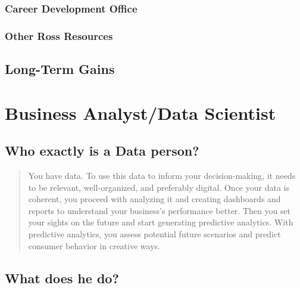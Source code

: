 \documentclass[
]{book}
\begin{document}
\hypertarget{career-development-office-1}{%
\subsection{Career Development Office}\label{career-development-office-1}}

\hypertarget{other-ross-resources-1}{%
\subsection{Other Ross Resources}\label{other-ross-resources-1}}

\hypertarget{long-term-gains-1}{%
\section{Long-Term Gains}\label{long-term-gains-1}}

\hypertarget{business-analystdata-scientist}{%
\chapter*{Business Analyst/Data Scientist}\label{business-analystdata-scientist}}

\hypertarget{who-exactly-is-a-data-person}{%
\section*{Who exactly is a Data person?}\label{who-exactly-is-a-data-person}}

\begin{quote}
You have data. To use this data to inform your decision-making, it needs to be relevant, well-organized, and preferably digital. Once your data is coherent, you proceed with analyzing it and creating dashboards and reports to understand your business's performance better. Then you set your sights on the future and start generating predictive analytics. With predictive analytics, you assess potential future scenarios and predict consumer behavior in creative ways.
\end{quote}

\hypertarget{what-does-he-do}{%
\section*{What does he do?}\label{what-does-he-do}}
\end{document}
